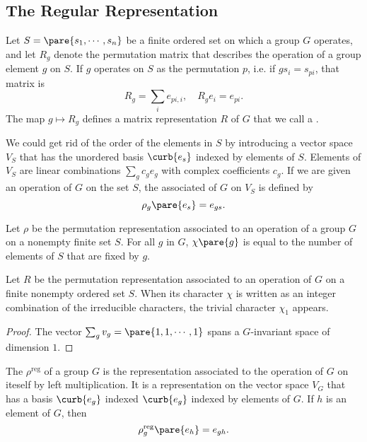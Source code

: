 \documentclass[hidelinks]{article}
\let\oldgloss\gloss
\def\gloss#1{\textnormal{\textbf{\oldgloss{#1}}}}
\begin{document}

\subsection{The Regular Representation} %
\label{sub:the_regular_representation}

Let $S=\pare{s_1,\cdots,s_n}$ be a finite ordered set on which a group $G$ operates, and let $R_g$ denote the permutation matrix that describes the operation of a group element $g$ on $S$. If $g$ operates on $S$ as the permutation $p$, i.e. if $gs_i = s_{pi}$, that matrix is
\[ R_g = \sum_i e_{pi,i},\quad R_g e_i = e_{pi}. \]
The map $g\mapsto R_g$ defines a matrix representation $R$ of $G$ that we call a .
\par
We could get rid of the order of the elements in $S$ by introducing a vector space $V_S$ that has the unordered basis $\curb{e_s}$ indexed by elements of $S$. Elements of $V_S$ are linear combinations $\sum_g c_g e_g$ with complex coefficients $c_g$. If we are given an operation of $G$ on the set $S$, the associated  of $G$ on $V_S$ is defined by
\[ \rho_g\pare{e_s} = e_{gs}. \]
\begin{lemma}
    Let $\rho$ be the permutation representation associated to an operation of a group $G$ on a nonempty finite set $S$. For all $g$ in $G$, $\chi\pare{g}$ is equal to the number of elements of $S$ that are fixed by $g$.
\end{lemma}
\begin{lemma}
    Let $R$ be the permutation representation associated to an operation of $G$ on a finite nonempty ordered set $S$. When its character $\chi$ is written as an integer combination of the irreducible characters, the trivial character $\chi_1$ appears.
\end{lemma}
\begin{proof}
    The vector $\sum_g v_g = \pare{1,1,\cdots,1}$ spans a $G$-invariant space of dimension $1$.
\end{proof}
\begin{definition}
    The  $\rho^{\mathrm{reg}}$ of a group $G$ is the representation associated to the operation of $G$ on iteself by left multiplication. It is a representation on the vector space $V_G$ that has a basis $\curb{e_g}$ indexed $\curb{e_g}$ indexed by elements of $G$. If $h$ is an element of $G$, then
    \[ \rho^{\mathrm{reg}}_g\pare{e_h} = e_{gh}. \]
\end{definition}
\end{document}
